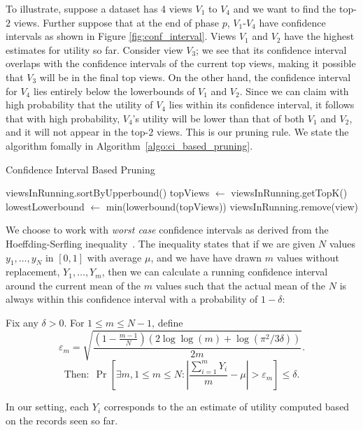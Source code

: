 To illustrate, suppose a dataset has 4 views $V_1$ to $V_4$ and we want to find the top-$2$ views.
Further suppose that at the end of phase $p$,
$V_1$-$V_4$ have confidence intervals as shown in Figure \ref{fig:conf_interval}.
Views $V_1$ and $V_2$ have the highest estimates for utility so far.
Consider view $V_3$; we see that its confidence interval overlaps with the
confidence intervals of the current top views, making it possible
that $V_3$ will be in the final top views. On the other hand, the confidence
interval for $V_4$ lies entirely below the lowerbounds of $V_1$ and $V_2$.
Since we can claim with high probability
that the utility of $V_4$ lies within its confidence interval, it follows that
with high probability, $V_4$'s utility will be lower than that of both $V_1$ and
$V_2$, and it will not appear in the top-$2$ views.
This is our pruning rule. 
We state the algorithm fomally in
Algorithm~\ref{algo:ci_based_pruning}.

\begin{algorithm}
\caption{Confidence Interval Based Pruning}
\label{algo:ci_based_pruning}
\begin{algorithmic}[1]
\State viewsInRunning.sortByUpperbound()
\State topViews $\gets$ viewsInRunning.getTopK()
\State lowestLowerbound $\gets$ min(lowerbound(topViews))
\State viewsInRunning.remove(view)
\EndIf
\EndFor
\end{algorithmic}
\end{algorithm}

We choose to work with {\it worst case} confidence intervals as derived from
the Hoeffding-Serfling inequality~\cite{serfling1974probability}.
The inequality states that if we are given $N$ values $y_1, \ldots, y_N$ in 
$[0, 1]$ with average $\mu$, and we have have drawn $m$ values without replacement, $Y_1, \ldots, Y_m$, 
then we can calculate a running confidence interval around the current mean 
of the $m$ values such that the actual mean of the $N$
is always within this confidence interval with a probability of $1 - \delta$:
\begin{theorem}
\label{thm:hs}
Fix any $\delta > 0$. For $1 \le m \le N-1$, define
$$
\varepsilon_m = \sqrt{\frac{(1-\frac{m-1}N)(2\log \log (m) + \log(\pi^2/3\delta))}{2m}}.
$$
$$
\textrm{Then:} \ \   \Pr\left[ \exists m, 1 \le m \le N : 
  \left|\frac{\sum_{i=1}^m Y_i}{m} - \mu\right| > \varepsilon_m \right] 
\le \delta.
$$

\end{theorem}
In our setting, each $Y_i$ corresponds to the an estimate of utility computed based on the
records seen so far. 

